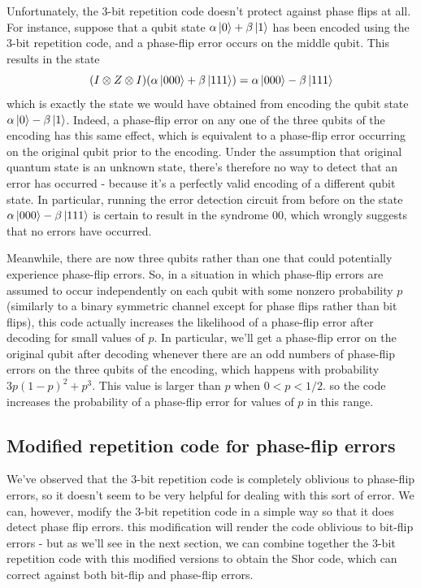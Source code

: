 \documentclass[12pt, oneside]{book}
\theoremstyle{definition}
\theoremstyle{definition}
\theoremstyle{remark}
\begin{document}
Unfortunately, the $3$-bit repetition code doesn't protect against phase flips at all. For instance, suppose that a qubit state $\alpha\ket{0}+\beta\ket{1}$ has been encoded using the $3$-bit repetition code, and a phase-flip error occurs on the middle qubit. This results in the state
\[
(I\otimes Z\otimes I)(\alpha\ket{000}+\beta\ket{111})=\alpha\ket{000}-\beta\ket{111}
\]
which is exactly the state we would have obtained from encoding the qubit state $\alpha\ket{0}-\beta\ket{1}$. Indeed, a phase-flip error on any one of the three qubits of the encoding has this same effect, which is equivalent to a phase-flip error occurring on the original qubit prior to the encoding. Under the assumption that original quantum state is an unknown state, there's therefore no way to detect that an error has occurred - because it's a perfectly valid encoding of a different qubit state. In particular, running the error detection circuit from before on the state $\alpha\ket{000}-\beta\ket{111}$ is certain to result in the syndrome $00$, which wrongly suggests that no errors have occurred.

Meanwhile, there are now three qubits rather than one that could potentially experience phase-flip errors. So, in a situation in which phase-flip errors are assumed to occur independently on each qubit with some nonzero probability $p$ (similarly to a binary symmetric channel except for phase flips rather than bit flips), this code actually increases the likelihood of a phase-flip error after decoding for small values of $p$. In particular, we'll get a phase-flip error on the original qubit after decoding whenever there are an odd numbers of phase-flip errors on the three qubits of the encoding, which happens with probability $3p(1-p)^2+p^3$. This value is larger than $p$ when $0<p<1/2$. so the code increases the probability of a phase-flip error for values of $p$ in this range.

\subsection{Modified repetition code for phase-flip errors}
We've observed that the $3$-bit repetition code is completely oblivious to phase-flip errors, so it doesn't seem to be very helpful for dealing with this sort of error. We can, however, modify the $3$-bit repetition code in a simple way so that it does detect phase flip errors. this modification will render the code oblivious to bit-flip errors - but as we'll see in the next section, we can combine together the $3$-bit repetition code with this modified versions to obtain the Shor code, which can correct against both bit-flip and phase-flip errors.
\end{document}
